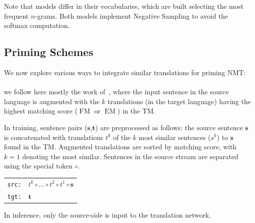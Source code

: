 Note that models differ in their vocabularies, which are built selecting the most frequent $n$-grams.
Both models implement Negative Sampling to avoid the softmax computation. %

\subsection{Priming Schemes}
\label{ssec:schemes}

We now explore various ways to integrate similar translations for priming NMT:

\paragraph{} we follow here mostly the work of~\citet{bulte19neural},
where the input sentence in the source language is augmented with the $k$ translations (in the target language) having the highest matching score ($\operatorname{FM}$ or $\operatorname{EM}$) in the TM. 

In training, sentence pairs ($\textbf{s}$,$\textbf{t}$) are preprocessed as follows: the source sentence $\textbf{s}$ is concatenated with translations $t^k$ of the $k$ most similar sentences ($s^k$) to $\textbf{s}$ found in the TM. Augmented translations are sorted by matching score, with $k=1$ denoting the most similar. Sentences in the source stream are separated using the special token $\circ$.

\begin{center}
\begin{tabular}{ll}
\texttt{src:} & $t^{k} \circ ... \circ t^{2} \circ t^{1} \circ \textbf{s}$ \\
\texttt{tgt:} & $\textbf{t}$%
\end{tabular}
\end{center}
\noindent In inference, only the source-side is input to the translation network.

